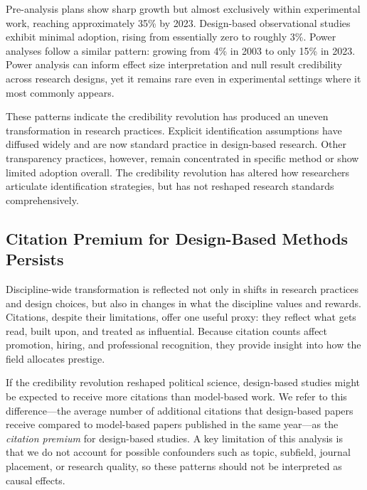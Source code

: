 \documentclass[12pt]{article}
\begin{document}
Pre-analysis plans show sharp growth but almost exclusively within experimental work, reaching approximately 35\% by 2023. Design-based observational studies exhibit minimal adoption, rising from essentially zero to roughly 3\%. Power analyses follow a similar pattern: growing from 4\% in 2003 to only 15\% in 2023. Power analysis can inform effect size interpretation and null result credibility across research designs, yet it remains rare even in experimental settings where it most commonly appears.

These patterns indicate the credibility revolution has produced an uneven transformation in research practices. Explicit identification assumptions have diffused widely and are now standard practice in design-based research. Other transparency practices, however, remain concentrated in specific method or show limited adoption overall. The credibility revolution has altered how researchers articulate identification strategies, but has not reshaped research standards comprehensively.

\fi

\FloatBarrier

\subsection*{Citation Premium for Design-Based Methods Persists}\label{sec:impact} 

Discipline-wide transformation is reflected not only in shifts in research practices and design choices, but also in changes in what the discipline values and rewards. Citations, despite their limitations, offer one useful proxy: they reflect what gets read, built upon, and treated as influential. Because citation counts affect promotion, hiring, and professional recognition, they provide insight into how the field allocates prestige.

If the credibility revolution reshaped political science, design-based studies might be expected to receive more citations than model-based work. We refer to this difference---the average number of additional citations that design-based papers receive compared to model-based papers published in the same year---as the \emph{citation premium} for design-based studies. A key limitation of this analysis is that we do not account for possible confounders such as topic, subfield, journal placement, or research quality, so these patterns should not be interpreted as causal effects.
\end{document}

